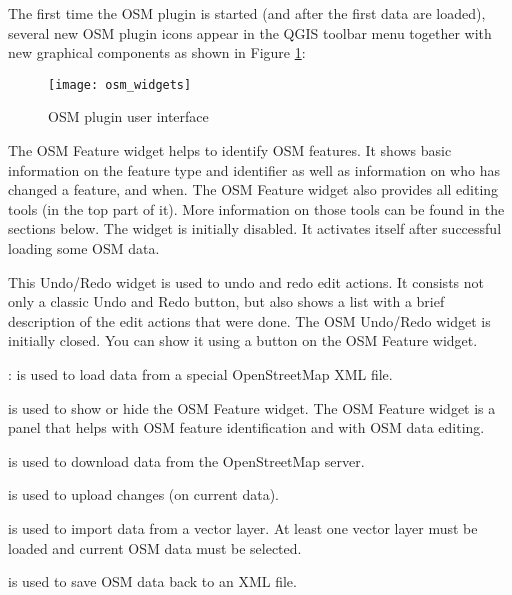 The first time the OSM plugin is started (and after the first data are
loaded), several new OSM plugin icons appear in the QGIS toolbar menu
together with new graphical components as shown in Figure
\ref{fig:osmwidget}:

\begin{figure}[ht]
   \centering
   \texttt{[image: osm\_widgets]}
   \caption{OSM plugin user interface \nixcaption}\label{fig:osmwidget}
\end{figure}


The OSM Feature widget helps to identify OSM features. It
shows basic information on the feature type and identifier as well as information on
who has changed a feature, and when. The OSM Feature widget also provides all
editing tools (in the top part of it). More information on those tools can be
found in the sections below. The widget is initially disabled. It
activates itself after successful loading some OSM data.


This Undo/Redo widget is used to undo and redo edit actions. It consists
not only a classic Undo and Redo button, but also shows a list with a
brief description of the edit actions that were done. The OSM Undo/Redo
widget is initially closed. You can show it using a button on the OSM Feature
widget.


\begin{description}
\item {}: is used to load data from a
special OpenStreetMap XML file.
\item {} is
used to show or hide the OSM Feature widget. The OSM Feature widget is a
panel that helps with OSM feature identification and with OSM data editing.
\item {} is used to download data
from the OpenStreetMap server.
\item {} is used to upload changes
(on current data).
\item {} is used to import
data from a vector layer. At least one vector layer must be loaded and
current OSM data must be selected.
\item {} is used to save OSM data
back to an XML file.
\end{description}

